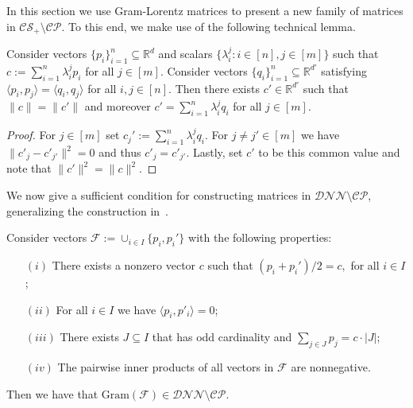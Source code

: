 \documentclass{siamart}
\begin{document}
{{In this section  we use  Gram-Lorentz matrices {to present} a new family of matrices in
${\mathcal{CS}_+}\setminus {\mathcal{CP}}$.
{To this end, we make use of the following technical lemma.}

\medskip 
\begin{lemma}\label{lem:Gramdecomp}
Consider vectors $\{p_i\}_{i=1}^n\subseteq {\mathbb{R}}^d$ and scalars
$\{\lambda_i^j: i\in [n],  j\in[m]\}$  such that $c:=\sum_{i=1}^n
\lambda^j_i p_i$ for all $j\in[m]$. Consider vectors
$\{q_i\}_{i=1}^n\subseteq {\mathbb{R}}^{d'}$ satisfying  ${\langle} p_i,p_j{\rangle}={\langle}
q_i,q_j{\rangle}$ for  all $i,j\in [n]$. Then there exists $c'\in {\mathbb{R}}^{d'}$
such that    ${\|c\|=\|c'\|}$ and moreover  $c'=\sum_{i=1}^n
\lambda^j_i q_i$ for all $j\in [m]$.
\end{lemma}
\medskip

\begin{proof}
For  $j\in [m]$ set  $c_j':= \sum_{i=1}^n\lambda^j_i q_i.$  For
$j\ne j' \in[m]$ we have  ${\| c'_j-c'_{j'}\|^2} =0$ and thus
$c'_j=c'_{j'}$. Lastly, set   $c'$ to be this common  value and note
that ${\|c'\|^2 = \|c\|^2}$.
\end{proof}
\vspace{0.1cm} 

{We now give} a sufficient condition for constructing matrices in ${\mathcal{DNN}}\setminus {\mathcal{CP}}$, generalizing the construction in~\cite{FW}.

\medskip 
\begin{theorem}
\label{thm:necessarycondnotcp}
Consider vectors ${\mathcal{F}}:=\cup_{i\in I}\{p_i,p_i'\}$ with the following properties:
\vspace{0.1cm}

\begin{itemize}
\item[$(i)$] There exists a {nonzero} vector $c$ such that $(p_i+p_i')/2=c,$ for all $i\in I$;
\item[$(ii)$] For all $i\in I$ we have ${\langle} p_i,p'_i{\rangle}=0$;
\item[$(iii)$] There exists $J\subseteq I$ that has odd cardinality and $\sum_{j\in J} p_j=c\cdot |J|$;
\item[$(iv)$] The pairwise inner products of all vectors in ${\mathcal{F}}$ are nonnegative.
\end{itemize}
\vspace{0.1cm}
Then  we have that ${\mathrm{Gram}}(\mathcal{F})\in {\mathcal{DNN}}\setminus {\mathcal{CP}}$.
\end{theorem}

}}
\end{document}

